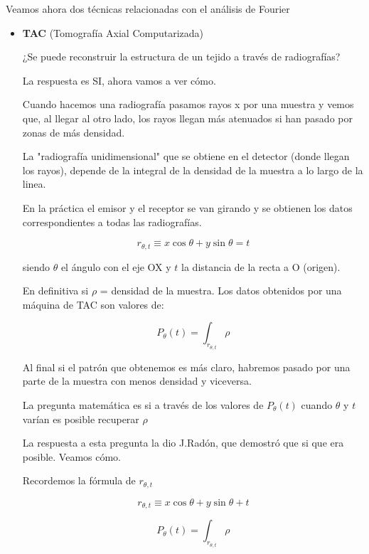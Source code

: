 Veamos ahora dos técnicas relacionadas con el análisis de Fourier
\begin{itemize}
\item \textbf{TAC} (Tomografía Axial Computarizada)

¿Se puede reconstruir la estructura de un tejido a través de radiografías?

	La respuesta es SI, ahora vamos a ver cómo.


	Cuando hacemos una radiografía pasamos rayos x por una muestra y vemos que, al llegar al otro lado, los rayos llegan más atenuados si han pasado por zonas de más densidad.

	La "radiografía unidimensional" que se obtiene en el detector (donde llegan los rayos), depende de la integral de la densidad de la muestra a lo largo de la linea.

	En la práctica el emisor y el receptor se van girando y se obtienen los datos correspondientes a todas las radiografías.

	$$r_{\theta , t} \equiv x \cos\theta + y\sin\theta = t$$

	\begin{center}
		\centering
	\end{center}

	siendo $\theta$ el ángulo con el eje OX y $t$ la distancia de la recta a O (origen).

	 \begin{center}
		\centering
	\end{center}


En definitiva si $\rho$ = densidad de la muestra. Los datos obtenidos por una máquina de TAC son valores de:

$$P_{\theta} (t) = \int_{r_{\theta , t}} \rho$$

Al final si el patrón que obtenemos es más claro, habremos pasado por una parte de la muestra con menos densidad y viceversa.

La pregunta matemática es si a través de los valores de $P_{\theta}(t)$ cuando $\theta$ y $t$ varían es posible recuperar $\rho$

La respuesta a esta pregunta la dio J.Radón, que demostró que si que era posible. Veamos cómo.

Recordemos la fórmula de $r_{\theta,t}$

	$$r_{\theta , t} \equiv x \cos\theta + y\sin\theta + t$$

	$$P_{\theta} (t) = \int_{r_{\theta , t}} \rho $$


\end{itemize}
